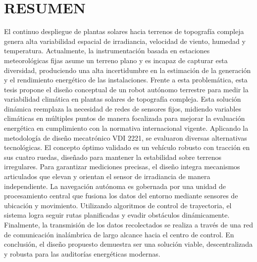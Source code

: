 \documentclass[../General.tex]{subfiles}
\begin{document}
\renewcommand{\baselinestretch}{1.5}
\chapter*{\centering \large RESUMEN} %

El continuo despliegue de plantas solares hacia terrenos de topografía compleja genera alta variabilidad espacial de irradiancia, velocidad de viento, humedad y temperatura. Actualmente, la instrumentación basada en estaciones meteorológicas fijas asume un terreno plano y es incapaz de capturar esta diversidad, produciendo una alta incertidumbre en la estimación de la generación y el rendimiento energético de las instalaciones.
Frente a esta problemática, esta tesis propone el diseño conceptual de un robot autónomo terrestre para medir la variabilidad climática en plantas solares de topografía compleja. Esta solución dinámica reemplaza la necesidad de redes de sensores fijos, midiendo variables climáticas en múltiples puntos de manera focalizada para mejorar la evaluación energética en cumplimiento con la normativa internacional vigente.
Aplicando la metodología de diseño mecatrónico VDI 2221, se evaluaron diversas alternativas tecnológicas. El concepto óptimo validado es un vehículo robusto con tracción en sus cuatro ruedas, diseñado para mantener la estabilidad sobre terrenos irregulares. Para garantizar mediciones precisas, el diseño integra mecanismos articulados que elevan y orientan el sensor de irradiancia de manera independiente.
La navegación autónoma es gobernada por una unidad de procesamiento central que fusiona los datos del entorno mediante sensores de ubicación y movimiento. Utilizando algoritmos de control de trayectoria, el sistema logra seguir rutas planificadas y evadir obstáculos dinámicamente. Finalmente, la transmisión de los datos recolectados se realiza a través de una red de comunicación inalámbrica de largo alcance hacia el centro de control. En conclusión, el diseño propuesto demuestra ser una solución viable, descentralizada y robusta para las auditorías energéticas modernas.
\end{document}
